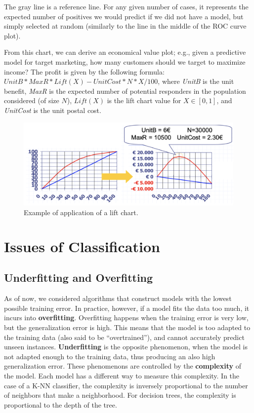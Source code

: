 The gray line is a reference line. For any given number of cases, it represents the expected number of positives we would predict if we did not have a model, but simply selected at random (similarly to the line in the middle of the ROC curve plot).

From this chart, we can derive an economical value plot; e.g., given a predictive model for target marketing, how many customers should we target to maximize income? The profit is given by the following formula: $\textit{UnitB} * \textit{MaxR} * \textit{Lift}(X) - \textit{UnitCost}*N*X/100$, where \textit{UnitB} is the unit benefit, \textit{MaxR} is the expected number of potential responders in the population considered (of size $N$), $\textit{Lift}(X)$ is the lift chart value for $X \in [0,1]$, and \textit{UnitCost} is the unit postal cost.

\begin{figure}[ht]
    \centering
    \includegraphics[width=0.5\linewidth]{img/Lift chart application.png}
    \caption{Example of application of a lift chart.}
\end{figure}


\section{Issues of Classification}

\subsection{Underfitting and Overfitting}

As of now, we considered algorithms that construct models with the lowest possible training error. In practice, however, if a model fits the data too much, it incurs into \textbf{overfitting}. Overfitting happens when the training error is very low, but the generalization error is high. This means that the model is too adapted to the training data (also said to be ``overtrained''), and cannot accurately predict unseen instances. \textbf{Underfitting} is the opposite phenomenon, when the model is not adapted enough to the training data, thus producing an also high generalization error. These phenomenons are controlled by the \textbf{complexity} of the model. Each model has a different way to measure this complexity. In the case of a K-NN classifier, the complexity is inversely proportional to the number of neighbors that make a neighborhood. For decision trees, the complexity is proportional to the depth of the tree.

